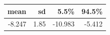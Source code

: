 
\begin{tabular}[t]{rrrr}
\toprule
mean & sd & 5.5\% & 94.5\%\\
\midrule
-8.247 & 1.85 & -10.983 & -5.412\\
\bottomrule
\end{tabular}
